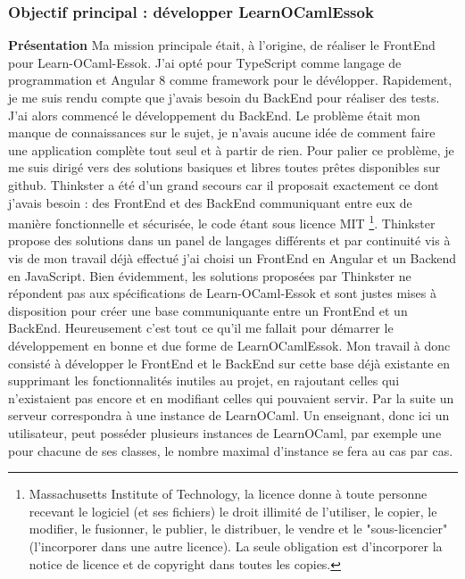 \documentclass{article}
\begin{document}
\subsubsection{Objectif principal : développer LearnOCamlEssok}
\textbf{Présentation}
\newline
\newline
Ma mission principale était, à l'origine, de réaliser le FrontEnd pour Learn-OCaml-Essok.
J'ai opté pour TypeScript comme langage de programmation et Angular 8 comme framework pour le dévélopper.
\newline
\newline
Rapidement, je me suis rendu compte que j'avais besoin du BackEnd pour réaliser des tests. J'ai alors commencé le développement du BackEnd.
Le problème était mon manque de connaissances sur le sujet, je n'avais aucune idée de comment faire une application complète tout seul et à partir de rien. Pour palier ce problème, je me suis dirigé vers des solutions basiques et libres toutes prêtes disponibles sur github.
\newline
\newline
Thinkster a été d'un grand secours car il proposait exactement ce dont j'avais besoin : des FrontEnd et des BackEnd communiquant entre eux de manière fonctionnelle et sécurisée, le code étant sous licence MIT \footnote{\label{MIT} Massachusetts Institute of Technology, la licence donne à toute personne recevant le logiciel (et ses fichiers) le droit illimité de l'utiliser, le copier, le modifier, le fusionner, le publier, le distribuer, le vendre et le "sous-licencier" (l'incorporer dans une autre licence). La seule obligation est d'incorporer la notice de licence et de copyright dans toutes les copies.}.
\newline
Thinkster propose des solutions dans un panel de langages différents et par continuité vis à vis de mon travail déjà effectué j'ai choisi un FrontEnd en Angular et un Backend en JavaScript.
\newline
\newline
Bien évidemment, les solutions proposées par Thinkster ne répondent pas aux spécifications de Learn-OCaml-Essok et sont justes mises à disposition pour créer une base communiquante entre un FrontEnd et un BackEnd. Heureusement c'est tout ce qu'il me fallait pour démarrer le développement en bonne et due forme de LearnOCamlEssok.
\newline
Mon travail à donc consisté à développer le FrontEnd et le BackEnd sur cette base déjà existante en supprimant les fonctionnalités inutiles au projet, en rajoutant celles qui n'existaient pas encore et en modifiant celles qui pouvaient servir.
\newline
\newline
Par la suite un serveur correspondra à une instance de LearnOCaml. Un enseignant, donc ici un utilisateur, peut posséder plusieurs instances de LearnOCaml, par exemple une pour chacune de ses classes, le nombre maximal d'instance se fera au cas par cas.
\newpage
\end{document}
